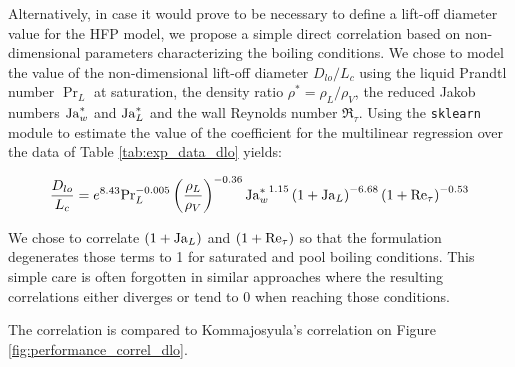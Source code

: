 Alternatively, in case it would prove to be necessary to define a lift-off diameter value for the HFP model, we propose a simple direct correlation based on non-dimensional parameters characterizing the boiling conditions. We chose to model the value of the non-dimensional lift-off diameter $D_{lo} / L_{c}$ using the liquid Prandtl number $\Pr_{L}$ at saturation, the density ratio $\rho^{*} = \rho_{L}/\rho_{V}$, the reduced Jakob numbers $\mathrm{Ja}_{w}^{*}$ and $\mathrm{Ja}_{L}^{*}$ and the wall Reynolds number $\Re_{\tau}$. Using the \texttt{sklearn} module to estimate the value of the coefficient for the multilinear regression over the data of Table \ref{tab:exp_data_dlo} yields: 

\begin{equation}
\frac{D_{lo}}{L_{c}} = e^{8.43} \mathrm{Pr}_{L}^{-0.005} \left( \frac{\rho_{L}}{\rho_{V}} \right)^{-0.36} {\mathrm{Ja}_{w}^{*}}^{1.15} \left( 1+\mathrm{Ja}_{L} \right)^{-6.68} \left( 1+\mathrm{Re}_{\tau} \right)^{-0.53}
\label{eq:correl_dlo}
\end{equation}

We chose to correlate $\left( 1+\mathrm{Ja}_{L} \right)$ and $\left( 1+\mathrm{Re}_{\tau} \right)$ so that the formulation degenerates those terms to 1 for saturated and pool boiling conditions. This simple care is often forgotten in similar approaches \cite{kommajosyula_development_2020, zhou_experimental_2020-1} where the resulting correlations either diverges or tend to 0 when reaching those conditions.

\npar

The correlation is compared to Kommajosyula's correlation \cite{kommajosyula_development_2020} on Figure \ref{fig:performance_correl_dlo}. 

